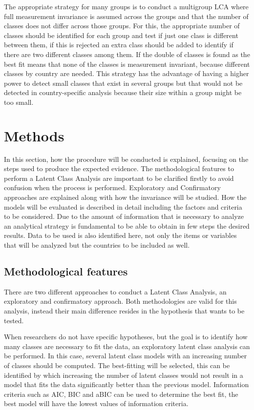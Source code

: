 \documentclass[12pt,a4paper,oneside]{reedthesis}
\begin{document}
The appropriate strategy for many groups is to conduct a multigroup LCA where full measurement invariance is assumed across the groups and that the number of classes does not differ across those groups. For this, the appropriate number of classes should be identified for each group and test if just one class is different between them, if this is rejected an extra class should be added to identify if there are two different classes among them. If the double of classes is found as the best fit means that none of the classes is measurement invariant, because different classes by country are needed. This strategy has the advantage of having a higher power to detect small classes that exist in several groups but that would not be detected in country-specific analysis because their size within a group might be too small.

\clearpage

\hypertarget{methods}{%
\chapter{Methods}\label{methods}}

In this section, how the procedure will be conducted is explained, focusing on the steps used to produce the expected evidence. The methodological features to perform a Latent Class Analysis are important to be clarified firstly to avoid confusion when the process is performed. Exploratory and Confirmatory approaches are explained along with how the invariance will be studied. How the models will be evaluated is described in detail including the factors and criteria to be considered. Due to the amount of information that is necessary to analyze an analytical strategy is fundamental to be able to obtain in few steps the desired results. Data to be used is also identified here, not only the items or variables that will be analyzed but the countries to be included as well.

\hypertarget{methodological-features}{%
\section{Methodological features}\label{methodological-features}}

There are two different approaches to conduct a Latent Class Analysis, an exploratory and confirmatory approach. Both methodologies are valid for this analysis, instead their main difference resides in the hypothesis that wants to be tested.

When researchers do not have specific hypotheses, but the goal is to identify how many classes are necessary to fit the data, an exploratory latent class analysis can be performed. In this case, several latent class models with an increasing number of classes should be computed. The best-fitting will be selected, this can be identified by which increasing the number of latent classes would not result in a model that fits the data significantly better than the previous model. Information criteria such as AIC, BIC and aBIC can be used to determine the best fit, the best model will have the lowest values of information criteria.
\end{document}

